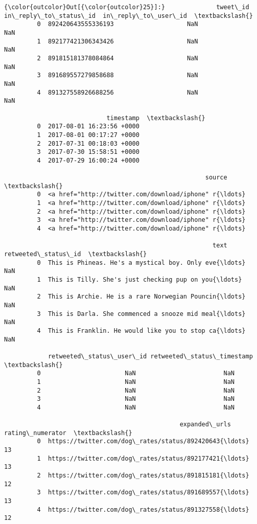 \documentclass[11pt]{article}
\begin{document}
\begin{Verbatim}[commandchars=\\\{\}]
{\color{outcolor}Out[{\color{outcolor}25}]:}              tweet\_id  in\_reply\_to\_status\_id  in\_reply\_to\_user\_id  \textbackslash{}
         0  892420643555336193                    NaN                  NaN   
         1  892177421306343426                    NaN                  NaN   
         2  891815181378084864                    NaN                  NaN   
         3  891689557279858688                    NaN                  NaN   
         4  891327558926688256                    NaN                  NaN   
         
                            timestamp  \textbackslash{}
         0  2017-08-01 16:23:56 +0000   
         1  2017-08-01 00:17:27 +0000   
         2  2017-07-31 00:18:03 +0000   
         3  2017-07-30 15:58:51 +0000   
         4  2017-07-29 16:00:24 +0000   
         
                                                       source  \textbackslash{}
         0  <a href="http://twitter.com/download/iphone" r{\ldots}   
         1  <a href="http://twitter.com/download/iphone" r{\ldots}   
         2  <a href="http://twitter.com/download/iphone" r{\ldots}   
         3  <a href="http://twitter.com/download/iphone" r{\ldots}   
         4  <a href="http://twitter.com/download/iphone" r{\ldots}   
         
                                                         text  retweeted\_status\_id  \textbackslash{}
         0  This is Phineas. He's a mystical boy. Only eve{\ldots}                  NaN   
         1  This is Tilly. She's just checking pup on you{\ldots}                  NaN   
         2  This is Archie. He is a rare Norwegian Pouncin{\ldots}                  NaN   
         3  This is Darla. She commenced a snooze mid meal{\ldots}                  NaN   
         4  This is Franklin. He would like you to stop ca{\ldots}                  NaN   
         
            retweeted\_status\_user\_id retweeted\_status\_timestamp  \textbackslash{}
         0                       NaN                        NaN   
         1                       NaN                        NaN   
         2                       NaN                        NaN   
         3                       NaN                        NaN   
         4                       NaN                        NaN   
         
                                                expanded\_urls  rating\_numerator  \textbackslash{}
         0  https://twitter.com/dog\_rates/status/892420643{\ldots}                13   
         1  https://twitter.com/dog\_rates/status/892177421{\ldots}                13   
         2  https://twitter.com/dog\_rates/status/891815181{\ldots}                12   
         3  https://twitter.com/dog\_rates/status/891689557{\ldots}                13   
         4  https://twitter.com/dog\_rates/status/891327558{\ldots}                12   
         

\end{Verbatim}
\end{document}
